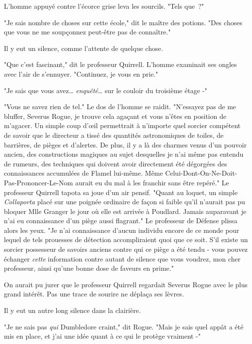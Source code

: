 L'homme appuyé contre l'écorce grise leva les sourcils. "Tels que~?"

"Je sais nombre de choses sur cette école," dit le maître des potions. "Des choses que vous ne me soupçonnez peut-être pas de connaître."

Il y eut un silence, comme l'attente de quelque chose.

"Que c'est fascinant," dit le professeur Quirrell. L'homme examinait ses ongles avec l'air de s'ennuyer. "Continuez, je vous en prie."

"Je sais que vous avez… \emph{enquêté}… sur le couloir du troisième étage -"

"Vous ne savez rien de tel." Le dos de l'homme se raidit. "N'essayez pas de me bluffer, Severus Rogue, je trouve cela agaçant et vous n'êtes en position de m'agacer. Un simple coup d'œil permettrait à n'importe quel sorcier compétent de savoir que le directeur a tissé des quantités astronomiques de toiles, de barrières, de pièges et d'alertes. De plus, il y a là des charmes venus d'un pouvoir ancien, des constructions magiques au sujet desquelles je n'ai même pas entendu de rumeurs, des techniques qui doivent avoir directement été dégorgées des connaissances accumulées de Flamel lui-même. Même Celui-Dont-On-Ne-Doit-Pas-Prononcer-Le-Nom aurait eu du mal à les franchir sans être repéré." Le professeur Quirrell tapota sa joue d'un air pensif. "Quant au loquet, un simple \emph{Collaporta} placé sur une poignée ordinaire de façon si faible qu'il n'aurait pas pu bloquer Mlle Granger le jour où elle est arrivée à Poudlard. Jamais auparavant je n'ai eu connaissance d'un piège aussi flagrant." Le professeur de Défense plissa alors les yeux. "Je n'ai connaissance d'aucun individu encore de ce monde pour lequel de tels prouesses de détection accompliraient quoi que ce soit. S'il existe un sorcier possesseur de savoirs anciens contre qui ce piège a été tendu - vous pouvez échanger \emph{cette} information contre autant de silence que vous voudrez, mon cher professeur, ainsi qu'une bonne dose de faveurs en prime."

On aurait pu jurer que le professeur Quirrell regardait Severus Rogue avec le plus grand intérêt. Pas une trace de sourire ne déplaça ses lèvres.

Il y eut un autre long silence dans la clairière.

"Je ne sais pas \emph{qui} Dumbledore craint," dit Rogue. "Mais je sais quel appât a été mis en place, et j'ai une idée quant à ce qui le protège vraiment -"

